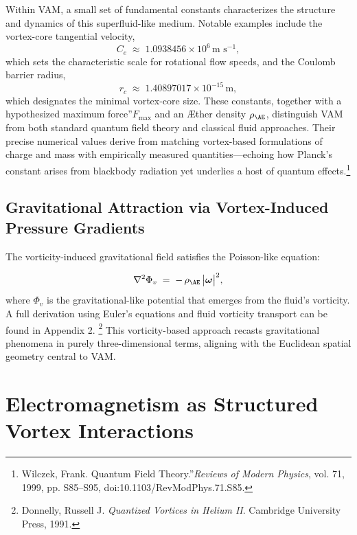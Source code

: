 \documentclass[a4paper,12pt]{article}
\begin{document}
Within VAM, a small set of fundamental constants characterizes the structure and dynamics of this superfluid-like medium. Notable examples include the vortex-core tangential velocity,
\[
    C_{e} \;\approx\; 1.0938456 \times 10^{6} \, \text{m s}^{-1},
\]
which sets the characteristic scale for rotational flow speeds, and the Coulomb barrier radius,
\[
    r_{c} \;\approx\; 1.40897017 \times 10^{-15} \, \text{m},
\]
which designates the minimal vortex-core size. These constants, together with a hypothesized \grqq maximum force\textquotedblright \(F_{\max}\) and an Æther density \(\rho_{\mathrm{\AE}}\), distinguish VAM from both standard quantum field theory and classical fluid approaches. Their precise numerical values derive from matching vortex-based formulations of charge and mass with empirically measured quantities—echoing how Planck's constant arises from blackbody radiation yet underlies a host of quantum effects.\footnote{Wilczek, Frank. \grqq Quantum Field Theory.\textquotedblright \textit{Reviews of Modern Physics}, vol. 71, 1999, pp. S85–S95, doi:10.1103/RevModPhys.71.S85.}

\subsection*{Gravitational Attraction via Vortex-Induced Pressure Gradients}
The vorticity-induced gravitational field satisfies the Poisson-like equation:

\[
    \nabla^2 \Phi_{v} \;=\; -\,\rho_{\mathrm{\AE}} \,\bigl|\boldsymbol{\omega}\bigr|^{2},
\]
where \(\Phi_{v}\) is the gravitational-like potential that emerges from the fluid's vorticity. A full derivation using Euler's equations and fluid vorticity transport can be found in Appendix 2.
\footnote{Donnelly, Russell J. \textit{Quantized Vortices in Helium II}. Cambridge University Press, 1991.} This vorticity-based approach recasts gravitational phenomena in purely three-dimensional terms, aligning with the Euclidean spatial geometry central to VAM.

\section{Electromagnetism as Structured Vortex Interactions}
\end{document}
